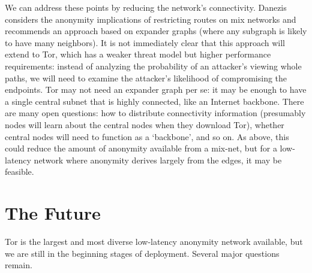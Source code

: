 \documentclass{llncs}
\begin{document}
We can address these points by reducing the network's connectivity.
Danezis~\cite{danezis-pets03} considers
the anonymity implications of restricting routes on mix networks and
recommends an approach based on expander graphs (where any subgraph is likely
to have many neighbors).  It is not immediately clear that this approach will
extend to Tor, which has a weaker threat model but higher performance
requirements: instead of analyzing the
probability of an attacker's viewing whole paths, we will need to examine the
attacker's likelihood of compromising the endpoints.
%
Tor may not need an expander graph per se: it
may be enough to have a single central subnet that is highly connected, like
an Internet backbone. %
There are many open questions: how to distribute connectivity information
(presumably nodes will learn about the central nodes
when they download Tor), whether central nodes
will need to function as a `backbone', and so on. As above,
this could reduce the amount of anonymity available from a mix-net,
but for a low-latency network where anonymity derives largely from
the edges, it may be feasible.


\section{The Future}
\label{sec:conclusion}

Tor is the largest and most diverse low-latency anonymity network
available, but we are still in the beginning stages of deployment. Several
major questions remain.
\end{document}
